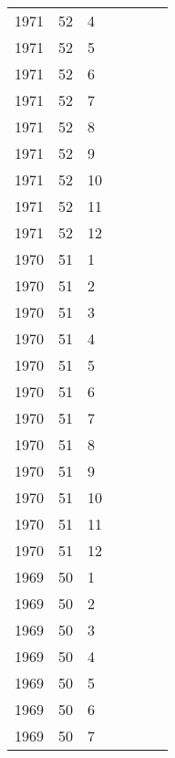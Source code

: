 \begin{longtable}{ |l|l|l|l|p{2.7cm}|l|p{2cm}| }
 1971 & 52 &     4 &         &                &  & \\
 1971 & 52 &     5 &         &                &  & \\
 1971 & 52 &     6 &         &                &  & \\
 1971 & 52 &     7 &         &                &  & \\
 1971 & 52 &     8 &         &                &  & \\
 1971 & 52 &     9 &         &                &  & \\
 1971 & 52 &    10 &         &                &  & \\
 1971 & 52 &    11 &         &                &  & \\
 1971 & 52 &    12 &         &                &  & \\
 1970 & 51 &     1 &         &                &  & \\
 1970 & 51 &     2 &         &                &  & \\
 1970 & 51 &     3 &         &                &  & \\
 1970 & 51 &     4 &         &                &  & \\
 1970 & 51 &     5 &         &                &  & \\
 1970 & 51 &     6 &         &                &  & \\
 1970 & 51 &     7 &         &                &  & \\
 1970 & 51 &     8 &         &                &  & \\
 1970 & 51 &     9 &         &                &  & \\
 1970 & 51 &    10 &         &                &  & \\
 1970 & 51 &    11 &         &                &  & \\
 1970 & 51 &    12 &         &                &  & \\
 1969 & 50 &     1 &         &                &  & \\
 1969 & 50 &     2 &         &                &  & \\
 1969 & 50 &     3 &         &                &  & \\
 1969 & 50 &     4 &         &                &  & \\
 1969 & 50 &     5 &         &                &  & \\
 1969 & 50 &     6 &         &                &  & \\
 1969 & 50 &     7 &         &                &  & \\

\end{longtable}
